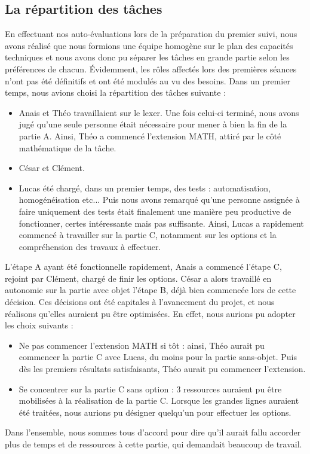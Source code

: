 \documentclass{article}
\begin{document}
\subsection{La répartition des tâches}
En effectuant nos auto-évaluations lors de la préparation du premier suivi, nous avons réalisé que nous formions une équipe homogène sur le plan des capacités techniques et nous avons donc pu séparer les tâches en grande partie selon les préférences de chacun. Évidemment, les rôles affectés lors des premières séances n'ont pas été définitifs et ont été modulés au vu des besoins. \newline
Dans un premier temps, nous avions choisi la répartition des tâches suivante :
\begin{itemize}
\item Anais et Théo travaillaient sur le lexer. Une fois celui-ci terminé, nous avons jugé qu'une seule personne était nécessaire pour
mener à bien la fin de la partie A. Ainsi, Théo a commencé l'extension MATH, attiré par le côté mathématique de la tâche.
\item César et Clément.
\item Lucas été chargé, dans un premier temps, des tests : automatisation, homogénéisation etc... Puis nous avons remarqué qu’une personne assignée à
faire uniquement des tests était finalement une manière peu productive de fonctionner, certes intéressante mais pas suffisante. Ainsi, Lucas a rapidement commencé
à travailler sur la partie C, notamment sur les options et la compréhension des travaux à effectuer.

\end{itemize}
L'étape A ayant été fonctionnelle rapidement, Anais a commencé l'étape C, rejoint par Clément, chargé de finir les options. César a alors travaillé en autonomie
sur la partie avec objet l'étape B, déjà bien commencée lors de cette décision. Ces décisions ont été capitales à l'avancement du projet,
et nous réalisons qu'elles auraient pu être optimisées. En effet, nous aurions pu adopter les choix suivants :
\begin{itemize}
\item Ne pas commencer l'extension MATH si tôt :  ainsi, Théo aurait pu commencer la partie C avec Lucas, du moins pour la partie sans-objet. Puis
dès les premiers résultats satisfaisants, Théo aurait pu commencer l'extension.
\item Se concentrer sur la partie C sans option : 3 ressources auraient pu être mobilisées à la réalisation de la partie C. Lorsque
les grandes lignes auraient été traitées, nous aurions pu désigner quelqu'un pour effectuer les options.

\end{itemize}
Dans l'ensemble, nous sommes tous d'accord pour dire qu'il aurait fallu accorder plus de temps et de ressources à cette partie, qui
demandait beaucoup de travail.
\end{document}
